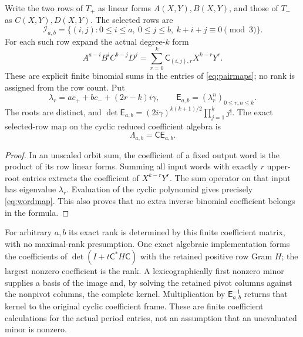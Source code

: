 \documentclass[11pt,a4paper]{article}
\begin{document}
Write the two rows of $T_+$ as linear forms $A(X,Y),B(X,Y)$, and those of $T_-$ as $C(X,Y),D(X,Y)$. The selected rows are
\begin{equation}
 \mathcal I_{a,b}=\{(i,j):0\le i\le a,\ 0\le j\le b,\ k+i+j\equiv0\pmod3\}.
\end{equation}
For each such row expand the actual degree-$k$ form
\begin{equation}
 A^{a-i}B^iC^{b-j}D^j=\sum_{r=0}^k\mathsf C_{(i,j),r}X^{k-r}Y^r.
 \label{eq:rowpoly}
\end{equation}
These are explicit finite binomial sums in the entries of \eqref{eq:pairmaps}; no rank is assigned from the row count.
Put
\begin{equation}
 \lambda_r=ac_++bc_-+(2r-k)i\gamma,
 \qquad \mathsf E_{a,b}=(\lambda_r^n)_{0\le r,n\le k}.
\end{equation}
The roots are distinct, and
$\det\mathsf E_{a,b}=(2i\gamma)^{k(k+1)/2}\prod_{j=1}^k j!$.
The exact selected-row map on the cyclic reduced coefficient algebra is
\begin{equation}
 \boxed{\Lambda_{a,b}=\mathsf C\mathsf E_{a,b}.}\label{eq:wordmap}
\end{equation}
\begin{proof}
In an unscaled orbit sum, the coefficient of a fixed output word is the product of its row linear forms. Summing all input words with exactly $r$ upper-root entries extracts the coefficient of $X^{k-r}Y^r$. The sum operator on that input has eigenvalue $\lambda_r$. Evaluation of the cyclic polynomial gives precisely \eqref{eq:wordmap}. This also proves that no extra inverse binomial coefficient belongs in the formula.
\end{proof}
For arbitrary $a,b$ its exact rank is determined by this finite coefficient matrix, with no maximal-rank presumption. One exact algebraic implementation forms the coefficients of $\det(I+t\mathsf C^*H\mathsf C)$ with the retained positive row Gram $H$; the largest nonzero coefficient is the rank. A lexicographically first nonzero minor supplies a basis of the image and, by solving the retained pivot columns against the nonpivot columns, the complete kernel. Multiplication by $\mathsf E_{a,b}^{-1}$ returns that kernel to the original cyclic coefficient frame. These are finite coefficient calculations for the actual period entries, not an assumption that an unevaluated minor is nonzero.
\end{document}
